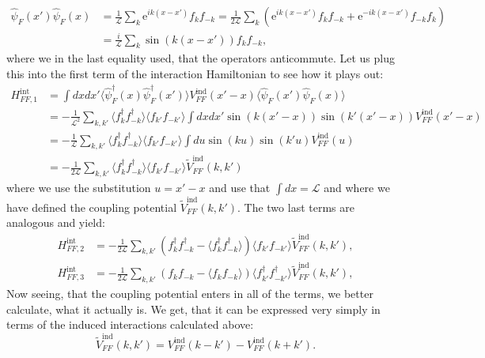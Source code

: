 \begin{align}
\hat{\psi}_F(x') \hat{\psi}_F(x) &= \frac{1}{\mathcal{L}}\sum_{k} \text{e}^{ik(x-x')}f_kf_{-k} = \frac{1}{2\mathcal{L}}\sum_{k} \left(\text{e}^{ik(x-x')}f_{k}f_{-k}+\text{e}^{-ik(x-x')}f_{-k}f_{k}\right) \nonumber \\
&= \frac{i}{\mathcal{L}}\sum_{k} \sin(k(x-x'))f_{k}f_{-k}, 
\end{align}
where we in the last equality used, that the operators anticommute. Let us plug this into the first term of the interaction Hamiltonian to see how it plays out: 
\begin{align}
H^\text{int}_{FF,1} &= \int dxdx' \langle \hat{\psi}^\dagger_F(x) \hat{\psi}^\dagger_F(x') \rangle V^\text{ind}_{FF}(x'-x) \langle \hat{\psi}_F(x') \hat{\psi}_F(x) \rangle \nonumber \\
&= - \frac{1}{\mathcal{L}^2}\sum_{k,k'}\langle f^\dagger_{k}f^\dagger_{-k} \rangle \langle f_{k'}f_{-k'} \rangle \int dx dx' \sin(k(x'-x))\sin(k'(x'-x))V^\text{ind}_{FF}(x'-x) \nonumber \\
&= - \frac{1}{\mathcal{L}}\sum_{k,k'}\langle f^\dagger_{k}f^\dagger_{-k} \rangle \langle f_{k'}f_{-k'} \rangle \int du \sin(ku)\sin(k'u)V^\text{ind}_{FF}(u) \nonumber \\
&= - \frac{1}{2\mathcal{L}}\sum_{k,k'}\langle f^\dagger_{k}f^\dagger_{-k} \rangle \langle f_{k'}f_{-k'} \rangle \tilde{V}^\text{ind}_{FF}(k,k')
\end{align}
where we use the substitution $u = x'-x$ and use that $\int dx = \mathcal{L}$ and where we have defined the coupling potential $\tilde{V}^\text{ind}_{FF}(k,k')$. The two last terms are analogous and yield:
\begin{align}
H^\text{int}_{FF,2} &= - \frac{1}{2\mathcal{L}}\sum_{k,k'}\left(f^\dagger_k f^\dagger_{-k} - \langle f^\dagger_k f^\dagger_{-k}\rangle\right)\langle f_{k'}f_{-k'} \rangle \tilde{V}^\text{ind}_{FF}(k,k'), \nonumber \\
H^\text{int}_{FF,3} &= - \frac{1}{2\mathcal{L}}\sum_{k,k'}\left(f_k f_{-k} - \langle f_k f_{-k}\rangle\right)\langle f^\dagger_{k'}f^\dagger_{-k'} \rangle \tilde{V}^\text{ind}_{FF}(k,k'), \nonumber
\end{align}
Now seeing, that the coupling potential enters in all of the terms, we better calculate, what it actually is. We get, that it can be expressed very simply in terms of the induced interactions calculated above:
\begin{equation}
\tilde{V}^\text{ind}_{FF}(k,k') = V^\text{ind}_{FF}(k-k') - V^\text{ind}_{FF}(k+k').
\end{equation}
